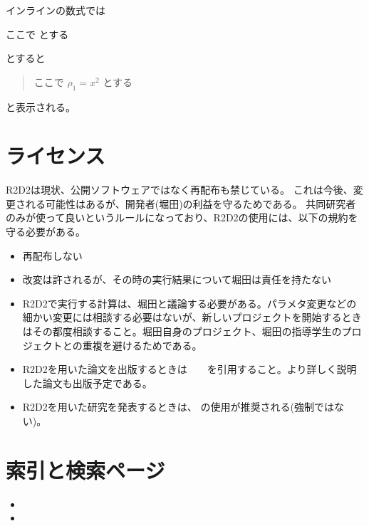 \documentclass[letterpaper,10pt,dvipdfmx,report]{sphinxmanual}
\begin{document}
インラインの数式では

\begin{sphinxVerbatim}[commandchars=\\\{\}]
ここで  とする
\end{sphinxVerbatim}

とすると
\begin{quote}

ここで \(\rho_1=x^2\) とする
\end{quote}

と表示される。


\chapter{ライセンス}
\label{\detokenize{index:id1}}
R2D2は現状、公開ソフトウェアではなく再配布も禁じている。
これは今後、変更される可能性はあるが、開発者(堀田)の利益を守るためである。
共同研究者のみが使って良いというルールになっており、R2D2の使用には、以下の規約を守る必要がある。
\begin{itemize}
\item {} 
再配布しない

\item {} 
改変は許されるが、その時の実行結果について堀田は責任を持たない

\item {} 
R2D2で実行する計算は、堀田と議論する必要がある。パラメタ変更などの細かい変更には相談する必要はないが、新しいプロジェクトを開始するときはその都度相談すること。堀田自身のプロジェクト、堀田の指導学生のプロジェクトとの重複を避けるためである。

\item {} 
R2D2を用いた論文を出版するときは　　を引用すること。より詳しく説明した論文も出版予定である。

\item {} 
R2D2を用いた研究を発表するときは、 の使用が推奨される(強制ではない)。

\end{itemize}


\chapter{索引と検索ページ}
\label{\detokenize{index:id3}}\begin{itemize}
\item {} 

\item {} 

\end{itemize}


\renewcommand{\indexname}{Pythonモジュール索引}
\begin{sphinxtheindex}
\let\bigletter\sphinxstyleindexlettergroup
\bigletter{r}
\item\relax{}
\end{sphinxtheindex}

\renewcommand{\indexname}{索引}
\printindex
\end{document}
